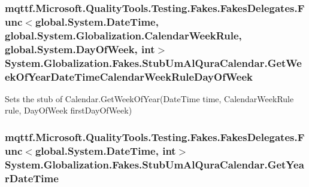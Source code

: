 \hypertarget{class_system_1_1_globalization_1_1_fakes_1_1_stub_um_al_qura_calendar_abe310e6c3a134af5b2001d46dc822d92}{
\subsubsection[{Get\-Week\-Of\-Year\-Date\-Time\-Calendar\-Week\-Rule\-Day\-Of\-Week}]{\setlength{\rightskip}{0pt plus 5cm}mqttf.\-Microsoft.\-Quality\-Tools.\-Testing.\-Fakes.\-Fakes\-Delegates.\-Func$<$global.\-System.\-Date\-Time, global.\-System.\-Globalization.\-Calendar\-Week\-Rule, global.\-System.\-Day\-Of\-Week, int$>$ System.\-Globalization.\-Fakes.\-Stub\-Um\-Al\-Qura\-Calendar.\-Get\-Week\-Of\-Year\-Date\-Time\-Calendar\-Week\-Rule\-Day\-Of\-Week}}\label{class_system_1_1_globalization_1_1_fakes_1_1_stub_um_al_qura_calendar_abe310e6c3a134af5b2001d46dc822d92}


Sets the stub of Calendar.\-Get\-Week\-Of\-Year(\-Date\-Time time, Calendar\-Week\-Rule rule, Day\-Of\-Week first\-Day\-Of\-Week)

\hypertarget{class_system_1_1_globalization_1_1_fakes_1_1_stub_um_al_qura_calendar_ae50375138247392f920faa27718dcf2f}{
\subsubsection[{Get\-Year\-Date\-Time}]{\setlength{\rightskip}{0pt plus 5cm}mqttf.\-Microsoft.\-Quality\-Tools.\-Testing.\-Fakes.\-Fakes\-Delegates.\-Func$<$global.\-System.\-Date\-Time, int$>$ System.\-Globalization.\-Fakes.\-Stub\-Um\-Al\-Qura\-Calendar.\-Get\-Year\-Date\-Time}}\label{class_system_1_1_globalization_1_1_fakes_1_1_stub_um_al_qura_calendar_ae50375138247392f920faa27718dcf2f}


